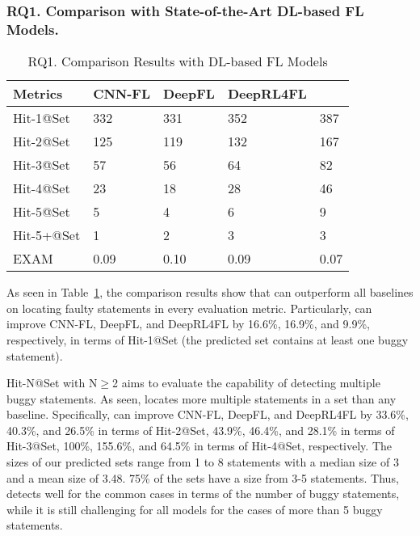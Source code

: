 \subsubsection{\bf RQ1. Comparison with State-of-the-Art DL-based FL Models.}
\label{sec:rq1-result}

\begin{table}[t]
	\caption{RQ1. Comparison Results with DL-based FL Models}
	{\small
		\begin{center}
			\renewcommand{\arraystretch}{1}
				\begin{tabular}{p{1.5cm}<{\centering}|p{1cm}<{\centering}|p{0.8cm}<{\centering}|p{1.2cm}<{\centering}|p{1.2cm}<{\centering}}
				\hline
				Metrics & CNN-FL & DeepFL & DeepRL4FL & \tool \\			
				\hline
				Hit-1@Set   & 332 & 331 & 352 & 387 \\
				Hit-2@Set	& 125 & 119 & 132 & 167 \\
				Hit-3@Set	& 57 & 56 & 64 & 82 \\
				Hit-4@Set	& 23 & 18 & 28 & 46 \\
				Hit-5@Set	& 5 & 4 & 6 & 9 \\
				Hit-5+@Set	& 1 & 2 & 3 & 3 \\
				EXAM     	& 0.09 & 0.10 & 0.09 & 0.07 \\
				\hline
			\end{tabular}
			
			\label{fig:rq1-0}
		\end{center}
	}
\end{table}

As seen in Table~\ref{fig:rq1-0}, the comparison results show that
{\tool} can outperform all baselines on locating faulty statements in
every evaluation metric. Particularly, {\tool} can improve CNN-FL,
DeepFL, and DeepRL4FL by 16.6\%, 16.9\%, and 9.9\%, respectively, in
terms of Hit-1@Set (the predicted set contains at least one buggy
statement).

Hit-N@Set with N$\geq$2 aims to evaluate the capability of detecting
multiple buggy statements. As seen, {\tool} locates more multiple
statements in a set than any baseline. Specifically, {\tool} can
improve CNN-FL, DeepFL, and DeepRL4FL by 33.6\%, 40.3\%, and 26.5\% in
terms of Hit-2@Set, 43.9\%, 46.4\%, and 28.1\% in terms of Hit-3@Set,
100\%, 155.6\%, and 64.5\% in terms of Hit-4@Set, respectively.
%
The sizes of our predicted sets range from 1 to 8 statements with a
median size of 3 and a mean size of 3.48. 75\% of the sets have a size from 3-5 statements. %
Thus, {\tool} detects well for the common cases in terms of the number of buggy statements, while it is still challenging for all models for the cases of more than 5 buggy statements.

